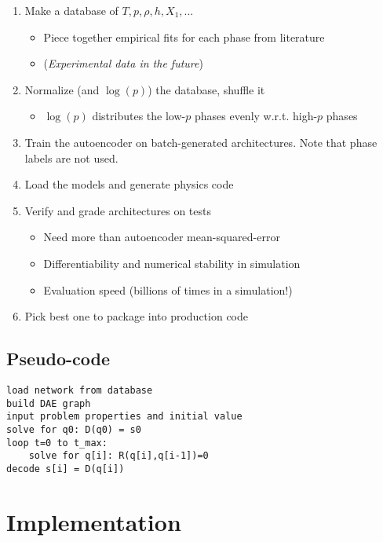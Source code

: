 \documentclass[]{article}
\begin{document}
\begin{enumerate}
\def\labelenumi{\arabic{enumi}.}
\item
  Make a database of \(T,p,\rho,h,X_1,...\)

  \begin{itemize}
  \item
    Piece together empirical fits for each phase from literature
  \item
    (\emph{Experimental data in the future})
  \end{itemize}
\item
  Normalize (and \(\log(p)\)) the database, shuffle it

  \begin{itemize}
  \item
    \(\log(p)\) distributes the low-\(p\) phases evenly w.r.t.
    high-\(p\) phases
  \end{itemize}
\item
  Train the autoencoder on batch-generated architectures. Note that
  phase labels are not used.
\item
  Load the models and generate physics code
\item
  Verify and grade architectures on tests

  \begin{itemize}
  \item
    Need more than autoencoder mean-squared-error
  \item
    Differentiability and numerical stability in simulation
  \item
    Evaluation speed (billions of times in a simulation!)
  \end{itemize}
\item
  Pick best one to package into production code
\end{enumerate}

\hypertarget{header-n3353}{%
\subsection{Pseudo-code}\label{header-n3353}}

\begin{verbatim}
load network from database
build DAE graph
input problem properties and initial value
solve for q0: D(q0) = s0
loop t=0 to t_max:
	solve for q[i]: R(q[i],q[i-1])=0
decode s[i] = D(q[i])
\end{verbatim}

\hypertarget{header-n3356}{%
\section{Implementation}\label{header-n3356}}
\end{document}
